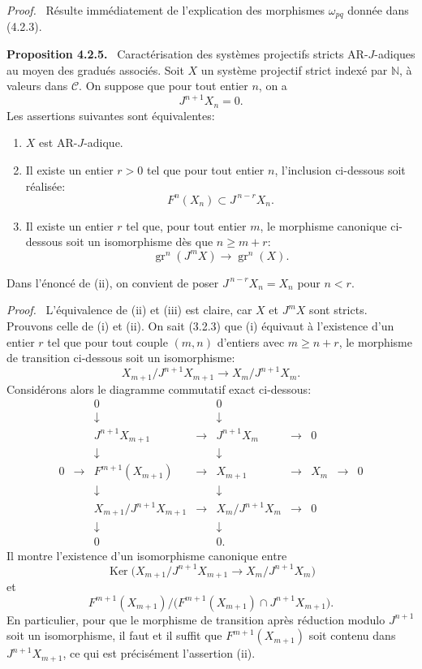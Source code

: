 \documentclass[11pt]{article}
\newenvironment{statement}[1]{\par\medskip\noindent\textbf{#1.}\ }{\par\medskip}
\newenvironment{prooftext}[1][Proof]{\par\noindent\emph{#1.}\ }{\par\medskip}
\providecommand{\Ker}{\operatorname{Ker}}
\providecommand{\gr}{\operatorname{gr}}
\providecommand{\Ker}{\operatorname{Ker}}
\providecommand{\gr}{\operatorname{gr}}
\providecommand{\gr}{\operatorname{gr}}
\providecommand{\Ker}{\operatorname{Ker}}
\begin{document}
\begin{prooftext}
Résulte immédiatement de l'explication des morphismes \(\omega_{pq}\) donnée dans (4.2.3).
\end{prooftext}

\begin{statement}{Proposition 4.2.5}
Caractérisation des systèmes projectifs stricts AR-\(J\)-adiques au moyen des gradués associés. Soit \(X\) un système projectif strict indexé par \(\mathbb N\), à valeurs dans \(\mathcal C\). On suppose que pour tout entier \(n\), on a
\[
J^{n+1}X_n=0.
\]
Les assertions suivantes sont équivalentes:
\begin{enumerate}[label=\textup{(\roman*)}]
\item \(X\) est AR-\(J\)-adique.
\item Il existe un entier \(r>0\) tel que pour tout entier \(n\), l'inclusion ci-dessous soit réalisée:
\[
F^n(X_n)\subset J^{\,n-r}X_n.
\]
\item Il existe un entier \(r\) tel que, pour tout entier \(m\), le morphisme canonique ci-dessous soit un isomorphisme dès que \(n\ge m+r\):
\[
\gr^n(J^mX)\longrightarrow \gr^n(X).
\]
\end{enumerate}
Dans l'énoncé de (ii), on convient de poser \(J^{\,n-r}X_n=X_n\) pour \(n<r\).
\end{statement}

\begin{prooftext}
L'équivalence de (ii) et (iii) est claire, car \(X\) et \(J^mX\) sont stricts. Prouvons celle de (i) et (ii). On sait (3.2.3) que (i) équivaut à l'existence d'un entier \(r\) tel que pour tout couple \((m,n)\) d'entiers avec \(m\ge n+r\), le morphisme de transition ci-dessous soit un isomorphisme:
\[
X_{m+1}/J^{n+1}X_{m+1}\longrightarrow X_m/J^{n+1}X_m.
\]
Considérons alors le diagramme commutatif exact ci-dessous:
\[
\begin{array}{ccccccccccc}
&&0&&0\\
&&\downarrow&&\downarrow\\
&&J^{n+1}X_{m+1}&\longrightarrow&J^{n+1}X_m&\longrightarrow&0\\
&&\downarrow&&\downarrow\\
0&\longrightarrow&F^{m+1}(X_{m+1})&\longrightarrow&X_{m+1}&\longrightarrow&X_m&\longrightarrow&0\\
&&\downarrow&&\downarrow\\
&&X_{m+1}/J^{n+1}X_{m+1}&\longrightarrow&X_m/J^{n+1}X_m&\longrightarrow&0\\
&&\downarrow&&\downarrow\\
&&0&&0 .
\end{array}
\]
Il montre l'existence d'un isomorphisme canonique entre
\[
\Ker\bigl(X_{m+1}/J^{n+1}X_{m+1}
       \longrightarrow X_m/J^{n+1}X_m\bigr)
\]
et
\[
F^{m+1}(X_{m+1})/
\bigl(F^{m+1}(X_{m+1})\cap J^{n+1}X_{m+1}\bigr).
\]
En particulier, pour que le morphisme de transition après réduction modulo \(J^{n+1}\) soit un isomorphisme, il faut et il suffit que \(F^{m+1}(X_{m+1})\) soit contenu dans \(J^{n+1}X_{m+1}\), ce qui est précisément l'assertion (ii).
\end{prooftext}
\end{document}
